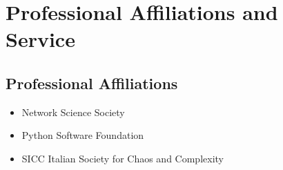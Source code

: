 \documentclass{academiccv}
\begin{document}






\section*{Professional Affiliations and Service}
\subsection*{Professional Affiliations}
\begin{itemize}
	\item Network Science Society
	\item Python Software Foundation
	\item SICC Italian Society for Chaos and Complexity
\end{itemize}
\end{document}
